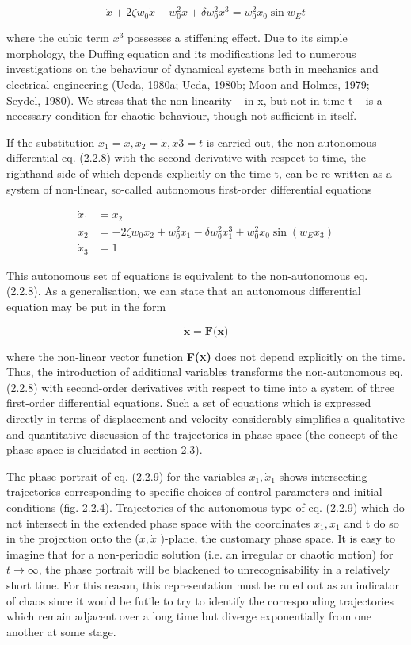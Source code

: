 \documentclass[12pt]{article}
\begin{document}
\[
\ddot{x} + 2 \zeta w_0 \dot{x} - w_0^2 x + \delta w_0^2 x^3 = w_0^2 x_0 \sin w_E t
\]

where the cubic term $x^3$ possesses a stiffening effect. Due to its simple morphology,
the Duffing equation and its modifications led to numerous investigations on
the behaviour of dynamical systems both in mechanics and electrical engineering
(Ueda, 1980a; Ueda, 1980b; Moon and Holmes, 1979; Seydel, 1980). We stress that
the non-linearity – in x, but not in time t – is a necessary condition for chaotic
behaviour, though not sufficient in itself.

\hfill

If the substitution $x_1=x, x_2=\dot{x}, x3=t$ is carried out, the non-autonomous
differential eq. (2.2.8) with the second derivative with respect to time, the righthand
side of which depends explicitly on the time t, can be re-written as a system
of non-linear, so-called autonomous first-order differential equations

\[
\begin{aligned}
\dot{x}_1 &= x_2 \\
\dot{x}_2 &= -2 \zeta w_0 x_2 + w_0^2 x_1 - \delta w_0^2 x_1^3 + w_0^2 x_0 \sin (w_E x_3) \\
\dot{x}_3 &= 1
\end{aligned}
\]


This autonomous set of equations is equivalent to the non-autonomous eq. (2.2.8).
As a generalisation, we can state that an autonomous differential equation may be
put in the form

\[
\dot{\textbf{x}} = \textbf{F(x)}
\]

where the non-linear vector function \textbf{F(x)} does not depend explicitly on the time.
Thus, the introduction of additional variables transforms the non-autonomous
eq. (2.2.8) with second-order derivatives with respect to time into a system of
three first-order differential equations. Such a set of equations which is expressed
directly in terms of displacement and velocity considerably simplifies a qualitative
and quantitative discussion of the trajectories in phase space (the concept of the
phase space is elucidated in section 2.3).

\hfill

The phase portrait of eq. (2.2.9) for the variables $x_1, \dot{x}_1$ shows intersecting trajectories
corresponding to specific choices of control parameters and initial conditions
(fig. 2.2.4). Trajectories of the autonomous type of eq. (2.2.9) which do not intersect
in the extended phase space with the coordinates $x_1, \dot{x}_1$ and t do so in the projection
onto the ($x, \dot{x}$ )-plane, the customary phase space. It is easy to imagine that for a
non-periodic solution (i.e. an irregular or chaotic motion) for $t \to \infty$, the phase
portrait will be blackened to unrecognisability in a relatively short time. For this
reason, this representation must be ruled out as an indicator of chaos since it would
be futile to try to identify the corresponding trajectories which remain adjacent
over a long time but diverge exponentially from one another at some stage.
\end{document}
